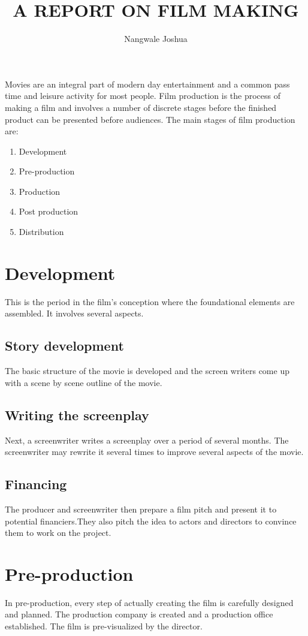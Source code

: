 \documentclass{article}
\begin{document}
\title{A REPORT ON FILM MAKING}
\author{Nangwale Joshua}
\maketitle

Movies are an integral part of modern day entertainment and a common pass time and leisure activity for most people. Film production is the process of making a film and involves a number of discrete stages before the finished product can be presented before audiences.
The main stages of film production are:
\begin{enumerate}
\item Development
\item Pre-production
\item Production
\item Post production
\item Distribution
\end{enumerate}

\section{Development}
This is the period in the film’s conception where the foundational elements are assembled. It involves several aspects.

\subsection{Story development}
The basic structure of the movie is developed and the screen writers come up with a scene by scene outline of the movie.

\subsection{Writing the screenplay}
Next, a screenwriter writes a screenplay over a period of several months. The screenwriter may rewrite it several times to improve several aspects of the movie.

\subsection{Financing}
The producer and screenwriter then prepare a film pitch and present it to potential financiers.They also pitch the idea to actors and directors to convince them to work on the project.

\section{Pre-production}
In pre-production, every step of actually creating the film is carefully designed and planned. The production company is created and a production office established. The film is pre-visualized by the director.
\end{document}

